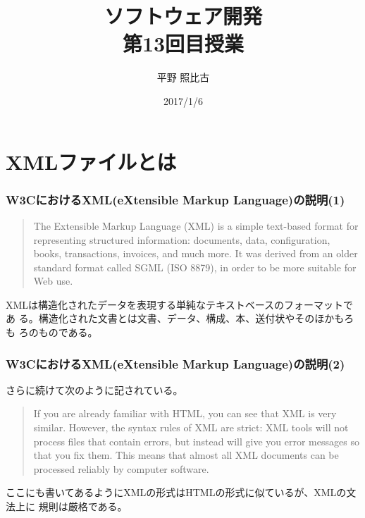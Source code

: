 
\title{ソフトウェア開発\\第13回目授業}
\author{平野 照比古}
\institute{}
\date{2017/1/6}
\newtheorem{Prob}{解説}
\newcommand{\Elm}[1]{\texttt{<#1>}}

\newcommand{\DOMM}{\texttt}
\newcommand{\Event}{\texttt}
\newcommand{\DOMP}{\texttt}
\newcommand{\DOM}{\texttt{DOM}}
\newcommand{\keyitem}{\relax}
\newcommand{\HTML}{HTML文書}

\frame{\maketitle}
\section{XMLファイルとは}
 \begin{frame}[containsverbatim]
  \frametitle{W3CにおけるXML(eXtensible Markup Language)の説明(1)}
\begin{quote}
 The Extensible Markup Language (XML) is a simple text-based format for
 representing structured information: documents, data, configuration,
 books, transactions, invoices, and much more. It was derived from an
 older standard format called SGML (ISO 8879), in order to be more
 suitable for Web use. 
\end{quote}
XMLは構造化されたデータを表現する単純なテキストベースのフォーマットであ
る。構造化された文書とは文書、データ、構成、本、送付状やそのほかもろも
ろのものである。
\end{frame}
\begin{frame}[containsverbatim]
  \frametitle{W3CにおけるXML(eXtensible Markup Language)の説明(2)}

さらに続けて次のように記されている。
\begin{quote}
 If you are already familiar with HTML, you can see that XML is very
 similar. However, the syntax rules of XML are strict: XML tools will
 not process files that contain errors, but instead will give you error
 messages so that you fix them. This means that almost all XML documents
 can be processed reliably by computer software. 

\end{quote}
ここにも書いてあるようにXMLの形式はHTMLの形式に似ているが、XMLの文法上に
規則は厳格である。
\end{frame}

